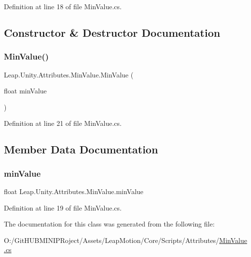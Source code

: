 Definition at line 18 of file Min\+Value.\+cs.



\subsection{Constructor \& Destructor Documentation}
\mbox{\label{class_leap_1_1_unity_1_1_attributes_1_1_min_value_a50d29094ef699f534d01b98e45aa7f7c}} 
\subsubsection{\texorpdfstring{MinValue()}{MinValue()}}
{\footnotesize\ttfamily Leap.\+Unity.\+Attributes.\+Min\+Value.\+Min\+Value (\begin{DoxyParamCaption}\item[{float}]{min\+Value }\end{DoxyParamCaption})}



Definition at line 21 of file Min\+Value.\+cs.



\subsection{Member Data Documentation}
\mbox{\label{class_leap_1_1_unity_1_1_attributes_1_1_min_value_a7caddfb2e69c9bbce5b0bbaf11cf78b3}} 
\subsubsection{\texorpdfstring{minValue}{minValue}}
{\footnotesize\ttfamily float Leap.\+Unity.\+Attributes.\+Min\+Value.\+min\+Value}



Definition at line 19 of file Min\+Value.\+cs.



The documentation for this class was generated from the following file\+:\begin{DoxyCompactItemize}
\item 
O\+:/\+Git\+H\+U\+B\+M\+I\+N\+I\+P\+Roject/\+Assets/\+Leap\+Motion/\+Core/\+Scripts/\+Attributes/\mbox{\hyperlink{_min_value_8cs}{Min\+Value.\+cs}}\end{DoxyCompactItemize}
